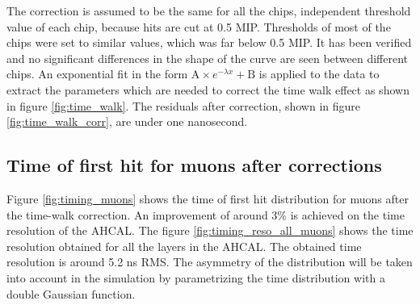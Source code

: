 The correction is assumed to be the same for all the chips, independent threshold value of each chip, because hits are cut at 0.5 MIP. Thresholds of most of the chips were set to similar values, which was far below 0.5 MIP. It has been verified and no significant differences in the shape of the curve are seen between different chips. An exponential fit in the form $\text{A} \times e^{-\lambda{}x} + \text{B}$ is applied to the data to extract the parameters which are needed to correct the time walk effect as shown in figure \ref{fig:time_walk}. The residuals after correction, shown in figure \ref{fig:time_walk_corr}, are under one nanosecond.

\subsection{Time of first hit for muons after corrections}
\label{subsec:Muon_final}

Figure \ref{fig:timing_muons} shows the time of first hit distribution for muons after the time-walk correction. An improvement of around 3\% is achieved on the time resolution of the AHCAL. The figure \ref{fig:timing_reso_all_muons} shows the time resolution obtained for all the layers in the AHCAL. The obtained time resolution is around 5.2 ns RMS. The asymmetry of the distribution will be taken into account in the simulation by parametrizing the time distribution with a double Gaussian function.

